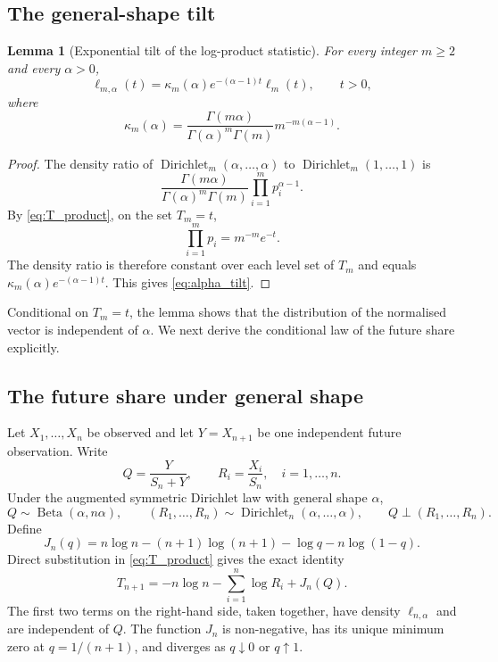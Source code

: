 \documentclass[11pt]{article}
\newtheorem{lemma}[theorem]{Lemma}
\theoremstyle{remark}
\newcommand{\Dir}{\operatorname{Dirichlet}}
\newcommand{\Bet}{\operatorname{Beta}}
\begin{document}
\subsection{The general-shape tilt}

\begin{lemma}[Exponential tilt of the log-product statistic]
\label{lem:alpha_tilt}
For every integer $m\ge2$ and every $\alpha>0$,
\begin{equation}
 \ell_{m,\alpha}(t)
 =\kappa_m(\alpha)e^{-(\alpha-1)t}\ell_m(t),
 \qquad t>0,
 \label{eq:alpha_tilt}
\end{equation}
where
\begin{equation}
 \kappa_m(\alpha)
 =\frac{\Gamma(m\alpha)}{\Gamma(\alpha)^m\Gamma(m)}
   m^{-m(\alpha-1)}.
 \label{eq:alpha_tilt_const}
\end{equation}
\end{lemma}

\begin{proof}
The density ratio of $\Dir_m(\alpha,\ldots,\alpha)$ to $\Dir_m(1,\ldots,1)$ is
\[
 \frac{\Gamma(m\alpha)}{\Gamma(\alpha)^m\Gamma(m)}
 \prod_{i=1}^m p_i^{\alpha-1}.
\]
By \eqref{eq:T_product}, on the set $T_m=t$,
\[
 \prod_{i=1}^m p_i=m^{-m}e^{-t}.
\]
The density ratio is therefore constant over each level set of $T_m$ and equals
$\kappa_m(\alpha)e^{-(\alpha-1)t}$. This gives \eqref{eq:alpha_tilt}.
\end{proof}

Conditional on $T_m=t$, the lemma shows that the distribution of the normalised vector is independent of $\alpha$. We next derive the conditional law of the future share explicitly.

\subsection{The future share under general shape}

Let $X_1,\ldots,X_n$ be observed and let $Y=X_{n+1}$ be one independent future observation. Write
\begin{equation}
 Q=\frac{Y}{S_n+Y},
 \qquad
 R_i=\frac{X_i}{S_n},\quad i=1,\ldots,n.
 \label{eq:Q_R}
\end{equation}
Under the augmented symmetric Dirichlet law with general shape $\alpha$,
\begin{equation}
 Q\sim\Bet(\alpha,n\alpha),
 \qquad
 (R_1,\ldots,R_n)\sim\Dir_n(\alpha,\ldots,\alpha),
 \qquad
 Q\perp(R_1,\ldots,R_n).
 \label{eq:general_alpha_decomp}
\end{equation}
Define
\begin{equation}
 J_n(q)
 =n\log n-(n+1)\log(n+1)-\log q-n\log(1-q).
 \label{eq:J}
\end{equation}
Direct substitution in \eqref{eq:T_product} gives the exact identity
\begin{equation}
 T_{n+1}
 =-n\log n-\sum_{i=1}^n\log R_i+J_n(Q).
 \label{eq:T_aug_identity}
\end{equation}
The first two terms on the right-hand side, taken together, have density $\ell_{n,\alpha}$ and are independent of $Q$.
The function $J_n$ is non-negative, has its unique minimum zero at $q=1/(n+1)$, and diverges as $q\downarrow0$ or $q\uparrow1$.
\end{document}
